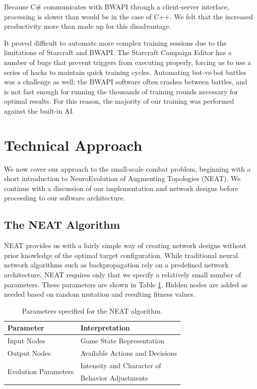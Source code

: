 \documentclass[a4paper]{article}
\begin{document}
Because C\# communicates with BWAPI through a client-server interface, processing is slower than would be in the case of C++. We felt that the increased productivity more than made up for this disadvantage.

It proved difficult to automate more complex training sessions due to the limitations of Starcraft and BWAPI. The Starcraft Campaign Editor has a number of bugs that prevent triggers from executing properly, forcing us to use a series of hacks to maintain quick training cycles. Automating bot-vs-bot battles was a challenge as well; the BWAPI software often crashes between battles, and is not fast enough for running the thousands of training rounds necessary for optimal results. For this reason, the majority of our training was performed against the built-in AI.

\section{Technical Approach}
\label{sec:tech}

We now cover our approach to the small-scale combat problem, beginning with a short introduction to NeuroEvolution of Augmenting Topologies (NEAT). We continue with a discussion of our implementation and network designs before proceeding to our software architecture.

\subsection{The NEAT Algorithm}
\label{sec:neat}

NEAT provides us with a fairly simple way of creating network designs without prior knowledge of the optimal target configuration. While traditional neural network algorithms such as backpropagation rely on a predefined network architecture, NEAT requires only that we specify a relatively small number of parameters. These parameters are shown in Table \ref{tab:neat_params}. Hidden nodes are added as needed based on random mutation and resulting fitness values.

\begin{table}
\centering
\begin{tabular}{|l|l|}
	\hline
	{\bf Parameter} & {\bf Interpretation}\\ \hline
	Input Nodes & Game State Representation\\ \hline
	Output Nodes & Available Actions and Decisions\\ \hline
	\multirow{2}{*}{Evolution Parameters} &  Intensity and Character of\\
	& Behavior Adjustments\\ \hline
\end{tabular}
\caption{Parameters specified for the NEAT algorithm.}
\label{tab:neat_params}
\end{table}
\end{document}

